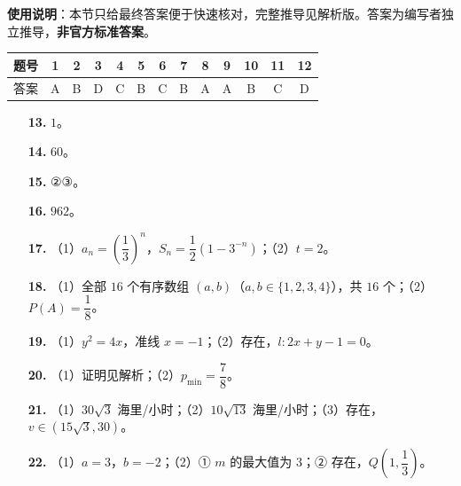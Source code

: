 
\begin{gknotice}
\textbf{使用说明}：本节只给最终答案便于快速核对，完整推导见解析版。答案为编写者独立推导，\textbf{非官方标准答案}。
\end{gknotice}

\begin{center}\begin{tabular}{ccccccccccccc}
\toprule
题号 & 1 & 2 & 3 & 4 & 5 & 6 & 7 & 8 & 9 & 10 & 11 & 12 \\
\midrule
答案 & A & B & D & C & B & C & B & A & A & B & C & D \\
\bottomrule
\end{tabular}\end{center}

\begin{itemize}[leftmargin=2.6em]
  \item[\textbf{13.}] $1$。
  \item[\textbf{14.}] $60$。
  \item[\textbf{15.}] ②③。
  \item[\textbf{16.}] $962$。
\end{itemize}

\begin{itemize}[leftmargin=2.6em]
  \item[\textbf{17.}] （1）$a_n=\left(\dfrac13\right)^n$，$S_n=\dfrac12\left(1-3^{-n}\right)$；（2）$t=2$。
  \item[\textbf{18.}] （1）全部 $16$ 个有序数组 $(a,b)$（$a,b\in\{1,2,3,4\}$），共 $16$ 个；（2）$P(A)=\dfrac18$。
  \item[\textbf{19.}] （1）$y^2=4x$，准线 $x=-1$；（2）存在，$l\colon2x+y-1=0$。
  \item[\textbf{20.}] （1）证明见解析；（2）$p_{\min}=\dfrac78$。
  \item[\textbf{21.}] （1）$30\sqrt3$ 海里/小时；（2）$10\sqrt{13}$ 海里/小时；（3）存在，$v\in\left(15\sqrt3,30\right)$。
  \item[\textbf{22.}] （1）$a=3$，$b=-2$；（2）① $m$ 的最大值为 $3$；② 存在，$Q\left(1,\dfrac13\right)$。
\end{itemize}
